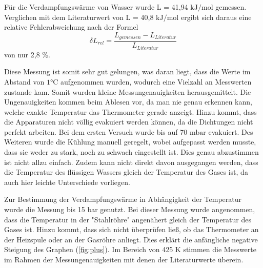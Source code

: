 Für die Verdampfungswärme von Wasser wurde L = 41,94 $\si{\kilo \joule \per \mol}$
gemessen. Verglichen mit dem Literaturwert von L = 40,8 $\si{\kilo \joule \per \mol}$
\cite{chemie} ergibt sich daraus eine relative Fehlerabweichung nach der Formel
\begin{equation}
  \delta L_{rel} = \frac{L_{gemessen}-L_{Literatur}}{L_{Literatur}}
\end{equation}
von nur 2,8 \%.

Diese Messung ist somit sehr gut gelungen, was daran liegt, dass die
Werte im Abstand von $1 \si{\celsius}$ aufgenommen wurden, wodurch eine Vielzahl
an Messwerten zustande kam. Somit wurden kleine Messungenauigkeiten herausgemittelt.
Die Ungenauigkeiten kommen beim Ablesen vor, da man nie genau erkennen kann, welche
exakte Temperatur das Thermometer gerade anzeigt. Hinzu kommt, dass die Apparaturen
nicht völlig evakuiert werden können, da die Dichtungen nicht perfekt arbeiten. Bei
dem ersten Versuch wurde bis auf 70 $\si{\milli \bar}$ evakuiert. Des Weiteren
wurde die Kühlung manuell geregelt, wobei aufgepasst werden musste, dass sie weder
zu stark, noch zu schwach eingestellt ist. Dies genau abzustimmen ist nicht
allzu einfach. Zudem kann nicht direkt davon ausgegangen werden, dass die Temperatur
des flüssigen Wassers gleich der Temperatur des Gases ist, da auch hier leichte
Unterschiede vorliegen.

Zur Bestimmung der Verdampfungswärme in Abhängigkeit der Temperatur wurde die Messung
bis 15 bar genutzt. Bei dieser Messung wurde angenommen, dass die Temperatur in
der "Stahlröhre" angenähert gleich der Temperatur des Gases ist. Hinzu kommt, dass
sich nicht überprüfen ließ, ob das Thermometer an der Heizspule oder an der Gasröhre
anliegt. Dies erklärt die anfängliche negative Steigung des Graphen (\ref{fig:plus}).
Im Bereich von 425 $\si{\kelvin}$ stimmen die Messwerte im Rahmen der Messungenauigkeiten
mit denen der Literaturwerte überein.
